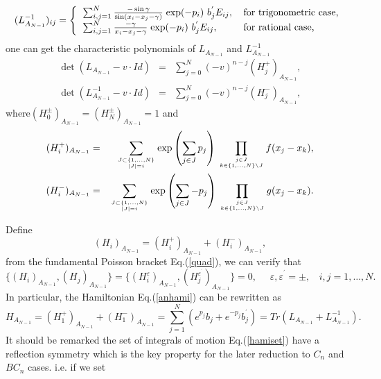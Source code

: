 \documentclass[a4paper,12pt]{article}
\def\QATOP#1#2{{#1 \atop #2}}
\begin{document}
\begin{equation}
(L_{A_{N-1}}^{-1})_{ij}=\left\{
\begin{tabular}{ll}
$\sum_{i,j=1}^{N}\frac{-\sin \gamma }{\sin (x_{i}-x_{j}-\gamma )}\;\mathrm{%
\exp }(-p_{i})\ b_{j}^{^{\prime }}E_{ij},$ & for trigonometric case, \\
$\sum_{i,j=1}^{N}\frac{-\gamma }{x_{i}-x_{j}-\gamma }\;\mathrm{\exp }%
(-p_{i})\ b_{j}^{^{\prime }}E_{ij},$ & for rational case,
\end{tabular}
\right.
\end{equation}
one can get the characteristic polynomials of $L_{A_{N-1}}$ and
$L_{A_{N-1}}^{-1}$\cite{r3}
\begin{eqnarray}
\det (L_{A_{N-1}}-v\cdot Id)
&=&\sum_{j=0}^{N}(-v)^{n-j}(H_{j}^{+})_{A_{N-1}}, \\
\det (L_{A_{N-1}}^{-1}-v\cdot Id)
&=&\sum_{j=0}^{N}(-v)^{n-j}(H_{j}^{-})_{A_{N-1}},
\end{eqnarray}
where$(H_{0}^{\pm })_{A_{N-1}}=(H_{N}^{\pm })_{A_{N-1}}=1$ and
\begin{eqnarray}
(H_{i}^{+})_{A_{N-1}} &=&\sum_{{{{{\QATOP{J\subset \{1,\ldots ,N\} }{\left|
J\right| =i}}}}}}\exp \left( \sum_{j\in J}p_{j}\right) \,\prod_{{{{{\QATOP{%
j\in J }{k\in \{1,\ldots ,N\}\setminus J}}}}}}f(x_{j}-x_{k}), \\
(H_{i}^{-})_{A_{N-1}} &=&\sum_{{{{{\QATOP{J\subset \{1,\ldots ,N\} }{\left|
J\right| =i}}}}}}\exp \left( \sum_{j\in J}-p_{j}\right) \,\prod_{{{{{\QATOP{%
j\in J }{k\in \{1,\ldots ,N\}\setminus J}}}}}}g(x_{j}-x_{k}).
\end{eqnarray}

\vspace{1pt}Define
\begin{equation}
(H_{i})_{A_{N-1}}=(H_{i}^{+})_{A_{N-1}}+(H_{i}^{-})_{A_{N-1}},
\label{hamiset}
\end{equation}
\vspace{1pt}from the fundamental Poisson bracket Eq.(\ref{quad}), we can
verify that
\begin{equation}
\{(H_{i})_{A_{N-1}},(H_{j})_{A_{N-1}}\}=\{(H_{i}^{\varepsilon
})_{A_{N-1}},(H_{j}^{\varepsilon ^{^{\prime }}})_{A_{N-1}}\}=0,\ \ \ \ \ \
\varepsilon ,\varepsilon ^{^{\prime }}=\pm ,\ \ \ \ i,j=1,\ldots
,N.
\label{aninv}
\end{equation}
In particular, the Hamiltonian Eq.(\ref{anhami}) can be rewritten as
\begin{equation}
H_{A_{N-1}}=(H_{1}^{+})_{A_{N-1}}+(H_{1}^{-})_{A_{N-1}}=%
\sum_{j=1}^{N}(e^{p_{j}}b_{j}+e^{-p_{j}}b_{j}^{^{\prime
}})=Tr(L_{A_{N-1}}+L_{A_{N-1}}^{-1}).
\end{equation}
It should be remarked the set of integrals of motion Eq.(\ref{hamiset}) have
a reflection symmetry which is the key property for the later reduction to $%
C_{n}$ and $BC_{n}$ cases. i.e. if we set
\end{document}

